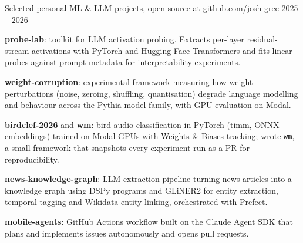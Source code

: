 

\begin{cventries}

  \cventry
    {Selected personal ML \& LLM projects, open source at github.com/josh-gree}
    {}
    {} %
    {2025 -- 2026} %
    {
      \begin{cvitems}
        \item {\textbf{probe-lab}: toolkit for LLM activation probing. Extracts per-layer residual-stream activations with PyTorch and Hugging Face Transformers and fits linear probes against prompt metadata for interpretability experiments.}
        \item {\textbf{weight-corruption}: experimental framework measuring how weight perturbations (noise, zeroing, shuffling, quantisation) degrade language modelling and behaviour across the Pythia model family, with GPU evaluation on Modal.}
        \item {\textbf{birdclef-2026} and \textbf{wm}: bird-audio classification in PyTorch (timm, ONNX embeddings) trained on Modal GPUs with Weights \& Biases tracking; wrote \texttt{wm}, a small framework that snapshots every experiment run as a PR for reproducibility.}
        \item {\textbf{news-knowledge-graph}: LLM extraction pipeline turning news articles into a knowledge graph using DSPy programs and GLiNER2 for entity extraction, temporal tagging and Wikidata entity linking, orchestrated with Prefect.}
        \item {\textbf{mobile-agents}: GitHub Actions workflow built on the Claude Agent SDK that plans and implements issues autonomously and opens pull requests.}
      \end{cvitems}
    }

\end{cventries}
